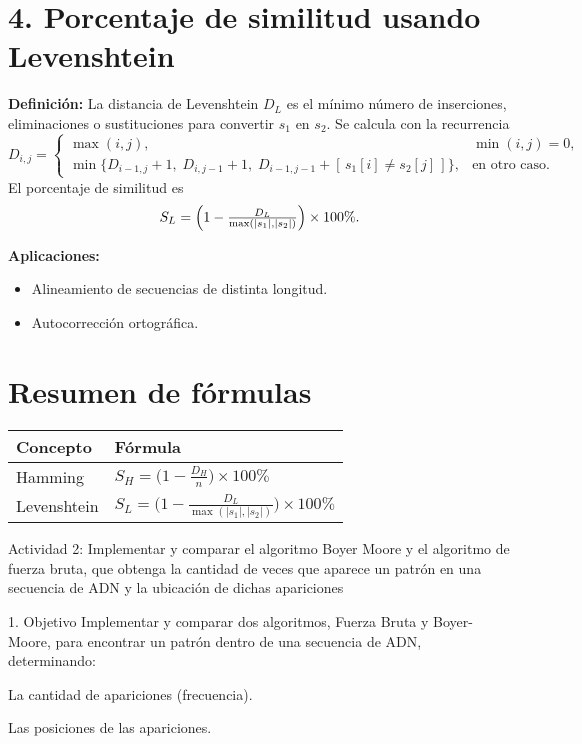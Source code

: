 \documentclass[fleqn,10pt]{article}
\begin{document}
\section*{4. Porcentaje de similitud usando Levenshtein}
\textbf{Definición:}  
La distancia de Levenshtein \(D_L\) es el mínimo número de inserciones, eliminaciones o sustituciones para convertir \(s_1\) en \(s_2\). Se calcula con la recurrencia
\[
D_{i,j}=
\begin{cases}
\max(i,j), & \min(i,j)=0,\\[6pt]
\min\bigl\{
    D_{i-1,j}+1,\;
    D_{i,j-1}+1,\;
    D_{i-1,j-1} + [\,s_1[i]\neq s_2[j]\,]
\bigr\}, & \text{en otro caso.}
\end{cases}
\]
El porcentaje de similitud es
\[
S_L = \Bigl(1 - \tfrac{D_L}{\max(|s_1|,|s_2|)}\Bigr)\times 100\%.
\]

\textbf{Aplicaciones:}
\begin{itemize}
    \item Alineamiento de secuencias de distinta longitud.
    \item Autocorrección ortográfica.
\end{itemize}

\section*{Resumen de fórmulas}
\begin{table}[h!]
    \centering
    \begin{tabular}{ll}
        \hline
        Concepto     & Fórmula \\ \hline
        Hamming      & \(S_H = \displaystyle\bigl(1-\tfrac{D_H}{n}\bigr)\times100\%\) \\
        Levenshtein  & \(S_L = \displaystyle\bigl(1-\tfrac{D_L}{\max(|s_1|,|s_2|)}\bigr)\times100\%\) \\ \hline
    \end{tabular}
\end{table}
Actividad 2: Implementar y comparar el algoritmo Boyer Moore y el algoritmo de
fuerza bruta, que obtenga la cantidad de veces que aparece un patrón en una secuencia
de ADN y la ubicación de dichas apariciones

1. Objetivo
Implementar y comparar dos algoritmos, Fuerza Bruta y Boyer-Moore, para encontrar un patrón dentro de una secuencia de ADN, determinando:

La cantidad de apariciones (frecuencia).

Las posiciones de las apariciones.
\end{document}
